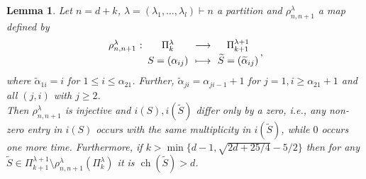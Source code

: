 \documentclass[11pt,a4paper]{amsart}
\newcommand{\abb}[5]{%
\setlength{\arraycolsep}{0.4ex}%
\begin{array}{rcccc}%
#1 &:\,& #2 & \,\,\longrightarrow\,\, & #3 \\[0.5ex]%
     & & #4 & \longmapsto & #5%
\end{array}%
}
\numberwithin{equation}{section}
\newtheorem{lemma}[thm]{Lemma}
\theoremstyle{definition}
\DeclareMathOperator{\ch}{ch}
\numberwithin{thm}{section}
\theoremstyle{break}
\numberwithin{subcase}{case}
\begin{document}
\begin{lemma} \label{le:lemma3}
Let $n=d+k$, $\lambda = (\lambda_1,\ldots,\lambda_l) \vdash n$ a partition and $\rho_{n,n+1}^\lambda$ a map defined by $$\abb{\rho_{n,n+1}^\lambda}{\Pi_k^\lambda}{\Pi_{k+1}^{\lambda +1}}{S=(\alpha_{ij})}{\widetilde{S}=(\widetilde{\alpha}_{ij})},$$ where $\widetilde{\alpha}_{1i}=i$ for $1 \leq i \leq \alpha_{21}$. Further, $\widetilde{\alpha}_{ji}=\alpha_{ji-1}+1$ for $j=1,i\geq \alpha_{21}+1$ and all $(j,i)$ with $j \geq 2$. \\
Then $ \rho_{n,n+1}^\lambda$ is injective and $i(S),i(\widetilde{S})$ differ only by a zero, i.e., any non-zero entry in $i(S)$ occurs with the same multiplicity in $i(\widetilde{S})$, while $0$ occurs one more time. Furthermore, if $k > \min \{d-1,\sqrt{2d+25/4}-5/2\}$ then for any $\widetilde{S} \in \Pi_{k+1}^{\lambda+1} \setminus \rho_{n,n+1}^\lambda (\Pi_k^\lambda)$ it is $\ch (\widetilde{S})> d$.
\end{lemma}
\end{document}
